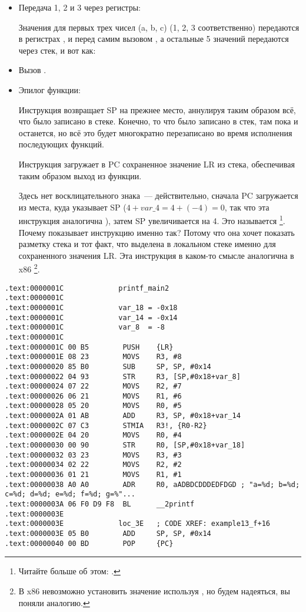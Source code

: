 \begin{itemize}
\item Передача 1, 2 и 3 через регистры:

Значения для первых трех чисел (a, b, c) (1, 2, 3 соответственно) передаются в регистрах 
,  и  перед самим вызовом \printf, а остальные 5 значений передаются через стек, и вот как:

\item Вызов \printf.

\item Эпилог функции:

Инструкция  возвращает \ac{SP} на прежнее место, 
аннулируя таким образом всё, что было записано в стеке.
Конечно, то что было записано в стек, там пока и останется, но всё это будет многократно 
перезаписано во время исполнения последующих функций.

Инструкция  загружает в \ac{PC} 
сохраненное значение \ac{LR} из стека, обеспечивая таким образом выход из функции.

Здесь нет восклицательного знака~--- действительно, сначала \ac{PC} загружается из места, куда указывает \ac{SP}
($4+var\_4=4+(-4)=0$, так что эта инструкция аналогична ), затем \ac{SP} увеличивается 
на 4.
Это называется \footnote{Читайте больше об этом: .}.
Почему \IDA показывает инструкцию именно так?
Потому что она хочет показать разметку стека и тот факт, что  выделена в локальном стеке именно для сохраненного
значения \ac{LR}.
Эта инструкция в каком-то смысле аналогична  в x86
\footnote{В x86 невозможно установить значение  используя \POP, но будем надеяться, вы поняли аналогию.}.

\end{itemize}

\myparagraph{\OptimizingKeilVI: \ThumbMode}

\begin{lstlisting}
.text:0000001C             printf_main2
.text:0000001C
.text:0000001C             var_18 = -0x18
.text:0000001C             var_14 = -0x14
.text:0000001C             var_8  = -8
.text:0000001C
.text:0000001C 00 B5        PUSH    {LR}
.text:0000001E 08 23        MOVS    R3, #8
.text:00000020 85 B0        SUB     SP, SP, #0x14
.text:00000022 04 93        STR     R3, [SP,#0x18+var_8]
.text:00000024 07 22        MOVS    R2, #7
.text:00000026 06 21        MOVS    R1, #6
.text:00000028 05 20        MOVS    R0, #5
.text:0000002A 01 AB        ADD     R3, SP, #0x18+var_14
.text:0000002C 07 C3        STMIA   R3!, {R0-R2}
.text:0000002E 04 20        MOVS    R0, #4
.text:00000030 00 90        STR     R0, [SP,#0x18+var_18]
.text:00000032 03 23        MOVS    R3, #3
.text:00000034 02 22        MOVS    R2, #2
.text:00000036 01 21        MOVS    R1, #1
.text:00000038 A0 A0        ADR     R0, aADBDCDDDEDFDGD ; "a=%d; b=%d; c=%d; d=%d; e=%d; f=%d; g=%"...
.text:0000003A 06 F0 D9 F8  BL      __2printf
.text:0000003E
.text:0000003E             loc_3E   ; CODE XREF: example13_f+16
.text:0000003E 05 B0        ADD     SP, SP, #0x14
.text:00000040 00 BD        POP     {PC}
\end{lstlisting}

